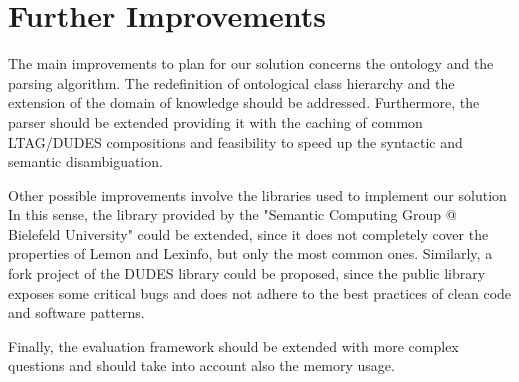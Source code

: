 \section{Further Improvements}
\label{sec:improvements}

The main improvements to plan for our solution concerns the ontology and the parsing algorithm.
%
The redefinition of ontological class hierarchy and the extension of the domain of knowledge should be addressed.
%
Furthermore, the parser should be extended providing it with the caching of common LTAG/DUDES compositions and feasibility to speed up the syntactic and semantic disambiguation.

Other possible improvements involve the libraries used to implement our solution
%
In this sense, the library provided by the "Semantic Computing Group @ Bielefeld University" could be extended, since it does not completely cover the properties of Lemon and Lexinfo, but only the most common ones.
%
Similarly, a fork project of the DUDES library could be proposed, since the public library exposes some critical bugs and does not adhere to the best practices of clean code and software patterns.

Finally, the evaluation framework should be extended with more complex questions and should take into account also the memory usage.